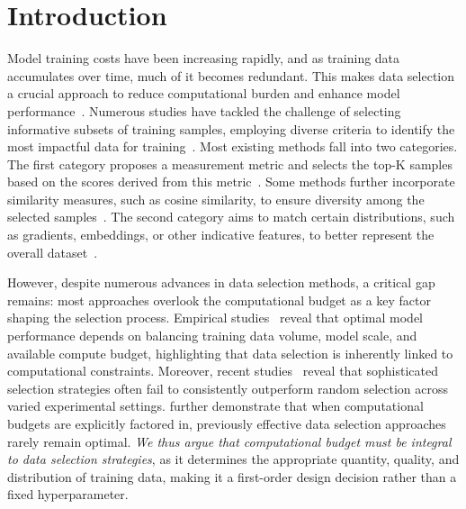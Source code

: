 \section{Introduction}
Model training costs have been increasing rapidly, and as training data accumulates over time, much of it becomes redundant. This makes data selection a crucial approach to reduce computational burden and enhance model performance~\cite{Settles2009ActiveLL, ds_Toneva2018AnES}. 
Numerous studies have tackled the challenge of selecting informative subsets of training samples, employing diverse criteria to identify the most impactful data for training~\cite{ds_albalak2022survey}. Most existing methods fall into two categories. The first category proposes a measurement metric and selects the top-K samples based on the scores derived from this metric~\cite{ds_ift_Khashabi2020UnifiedQACF, ds_ift_Yang2025DiversitydrivenDS, ds_ift_Zhao2024LongIM}. Some methods further incorporate similarity measures, such as cosine similarity, to ensure diversity among the selected samples~\cite{ds_ift_Yang2025DiversitydrivenDS}. The second category aims to match certain distributions, such as gradients, embeddings, or other indicative features, to better represent the overall dataset~\cite{ds_killamsetty2021grad,ds_bi_Killamsetty2020GLISTERGB,ds_submodular_Mirzasoleiman2019CoresetsFD,ds_ift_cluster_Zhang2024TAGCOSTG}.

However, despite numerous advances in data selection methods, a critical gap remains: most approaches overlook the computational budget as a key factor shaping the selection process. Empirical studies~\cite{hoffmann2022training, kaplan2020scaling} reveal that optimal model performance depends on balancing training data volume, model scale, and available compute budget, highlighting that data selection is inherently linked to computational constraints.
Moreover, recent studies~\citep{ds_ift_Diddee2024ChasingRI,ds_ift_Shen2024RethinkingDS,ds_ift_Xia2024RethinkingDS} reveal that sophisticated selection strategies often fail to consistently outperform random selection across varied experimental settings. \cite{Yin2024ComputeConstrainedDS} further demonstrate that when computational budgets are explicitly factored in, previously effective data selection approaches rarely remain optimal. {\it We thus argue that computational budget must be integral to data selection strategies}, as it determines the appropriate quantity, quality, and distribution of training data, making it a first-order design decision rather than a fixed hyperparameter.

